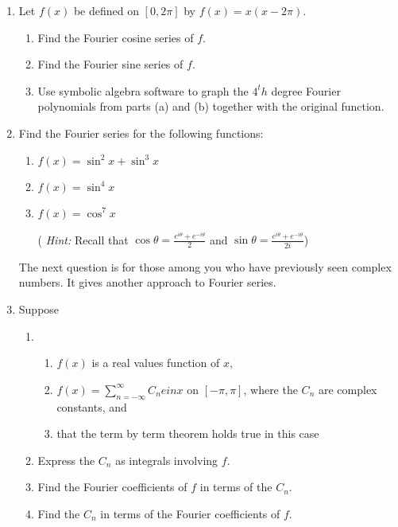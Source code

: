 \documentclass{article}
\begin{document}
\begin{enumerate}
\item Let $f(x)$ be defined on $[0,2\pi]$ by $f(x) = x(x-2\pi)$.
\begin{enumerate}
\item Find the Fourier cosine series of $f$.
\item Find the Fourier sine series of $f$.
\item Use symbolic algebra software to graph the $4^th$ degree Fourier polynomials from parts (a) and (b) together with the original function.
\end{enumerate}
\item Find the Fourier series for the following functions:
\begin{enumerate}
\item $f(x) = \sin^2x + \sin^3x$
\item $f(x) = \sin^4x$
\item $f(x) = \cos^7x$

( \textit{Hint:} Recall that $\cos \theta = \frac{e^{i\theta} + e^{-i\theta}}{2}$ and $\sin \theta = \frac{e^{i\theta} + e^{-i\theta}}{2i}$)
\end{enumerate}

The next question is for those among you who have previously seen complex numbers. It gives another approach to Fourier series.

\item Suppose
\begin{enumerate}
\item[] {}

\begin{enumerate}
\item $f(x)$ is a real values function of $x$,
\item $\displaystyle f(x) = \sum_{n=-\infty}^\infty C_ne{inx}$ on $[-\pi, \pi ]$, where the $C_n$ are complex constants, and
\item that the term by term theorem holds true in this case
\end{enumerate}


\item Express the $C_n$ as integrals involving $f$.
\item Find the Fourier coefficients of $f$ in terms of the $C_n$.
\item Find the $C_n$ in terms of the Fourier coefficients of $f$.
\end{enumerate}
\end{enumerate}
\end{document}
